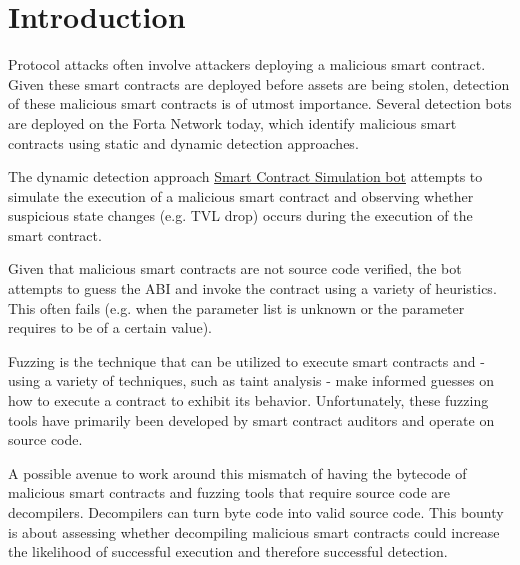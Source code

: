 \section{Introduction} \label{chap:introduction}

Protocol attacks often involve attackers deploying a malicious smart contract.
Given these smart contracts are deployed before assets are being stolen, detection of these malicious smart contracts is of utmost importance.
Several detection bots are deployed on the Forta Network today, which identify malicious smart contracts using static and dynamic detection approaches.

The dynamic detection approach \href{\urlbotsimulation}{Smart Contract Simulation bot} attempts to simulate the execution of a malicious smart contract and observing whether suspicious state changes (e.g. TVL drop) occurs during the execution of the smart contract.

Given that malicious smart contracts are not source code verified, the bot attempts to guess the ABI and invoke the contract using a variety of heuristics.
This often fails (e.g. when the parameter list is unknown or the parameter requires to be of a certain value).

Fuzzing is the technique that can be utilized to execute smart contracts and - using a variety of techniques, such as taint analysis - make informed guesses on how to execute a contract to exhibit its behavior.
Unfortunately, these fuzzing tools have primarily been developed by smart contract auditors and operate on source code.

A possible avenue to work around this mismatch of having the bytecode of malicious smart contracts and fuzzing tools that require source code are decompilers.
Decompilers can turn byte code into valid source code.
This bounty is about assessing whether decompiling malicious smart contracts could increase the likelihood of successful execution and therefore successful detection.
